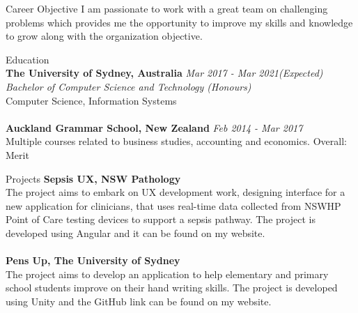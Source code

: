 \documentclass{resume} %
\begin{document}
\begin{rSection}{Career Objective}
 I am passionate to work with a great team on challenging problems which provides me the opportunity to improve my skills and knowledge to grow along with the organization objective.
\end{rSection}

\begin{rSection}{Education}
\\{\bf The University of Sydney, Australia} \hfill {\em Mar 2017 - Mar 2021(Expected)}
\\ \textit{ Bachelor of Computer Science and Technology (Honours)} 
\\  Computer Science, Information Systems\\ 
\\{\bf Auckland Grammar School, New Zealand} \hfill {\em Feb 2014 - Mar 2017} 
\\  Multiple courses related to business studies, accounting and economics. \hfill { Overall: Merit } 

\end{rSection}

\begin{rSection}{Projects}
{\bf Sepsis UX, NSW Pathology}
\\ The project aims to embark on UX development work, designing interface for a new application for clinicians, that uses real-time data collected from NSWHP Point of Care testing devices to support a sepsis pathway. The project is developed using Angular and it can be found on my website.\\
\\ {\bf Pens Up, The University of Sydney}
\\ The project aims to develop an application to help elementary and primary school students improve on their hand writing skills. The project is developed using Unity and the GitHub link can be found on my website.\\ 
\end{rSection}
\end{document}
